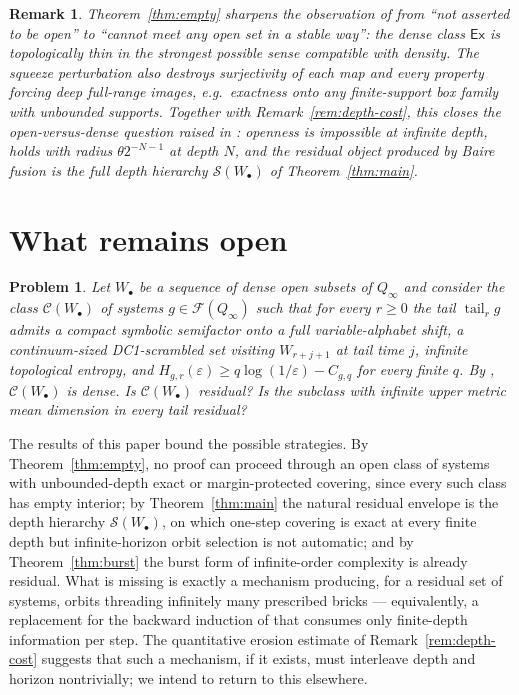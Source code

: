 \documentclass[11pt]{article}
\newtheorem{remark}[theorem]{Remark}
\newtheorem{problem}[theorem]{Problem}
\newcommand{\Q}{Q_\infty}
\newcommand{\F}{\mathcal{F}}
\newcommand{\EX}{\mathsf{Ex}}
\begin{document}
\begin{remark}
Theorem~\ref{thm:empty} sharpens the observation of \cite[Section~14]{Shmalo2026}
from ``not asserted to be open'' to ``cannot meet any open set in a stable way'': the
dense class $\EX$ is topologically thin in the strongest possible sense compatible
with density.  The squeeze perturbation also destroys surjectivity of each map and
every property forcing deep full-range images, e.g.\ exactness onto any
finite-support box family with unbounded supports.  Together with
Remark~\ref{rem:depth-cost}, this closes the open-versus-dense question raised in
\cite[Section~14]{Shmalo2026}: openness is impossible at infinite depth, holds with
radius $\theta2^{-N-1}$ at depth $N$, and the residual object produced by Baire
fusion is the full depth hierarchy $\mathcal S(W_\bullet)$ of
Theorem~\ref{thm:main}.
\end{remark}

\section{What remains open}\label{sec:open}

\begin{problem}\label{prob:main}
Let $W_\bullet$ be a sequence of dense open subsets of $\Q$ and consider the class
$\mathcal C(W_\bullet)$ of systems $g\in\F(\Q)$ such that for every $r\ge0$ the tail
$\operatorname{tail}_rg$ admits a compact symbolic semifactor onto a full
variable-alphabet shift, a continuum-sized DC1-scrambled set visiting
$W_{r+j+1}$ at tail time $j$, infinite topological entropy, and
$H_{g,r}(\varepsilon)\ge q\log(1/\varepsilon)-C_{g,q}$ for every finite $q$.  By
\cite[Theorem~3.6]{Shmalo2026}, $\mathcal C(W_\bullet)$ is dense.  Is
$\mathcal C(W_\bullet)$ residual?  Is the subclass with infinite upper metric mean
dimension in every tail residual?
\end{problem}

The results of this paper bound the possible strategies.  By
Theorem~\ref{thm:empty}, no proof can proceed through an open class of systems with
unbounded-depth exact or margin-protected covering, since every such class has empty
interior; by Theorem~\ref{thm:main} the natural residual envelope is the depth
hierarchy $\mathcal S(W_\bullet)$, on which one-step covering is exact at every
finite depth but infinite-horizon orbit selection is not automatic; and by
Theorem~\ref{thm:burst} the burst form of infinite-order complexity is already
residual.  What is missing is exactly a mechanism producing, for a residual set of
systems, orbits threading infinitely many prescribed bricks --- equivalently, a
replacement for the backward induction of \cite[Lemma~13.1]{Shmalo2026} that consumes
only finite-depth information per step.  The quantitative erosion estimate of
Remark~\ref{rem:depth-cost} suggests that such a mechanism, if it exists, must
interleave depth and horizon nontrivially; we intend to return to this elsewhere.
\end{document}
